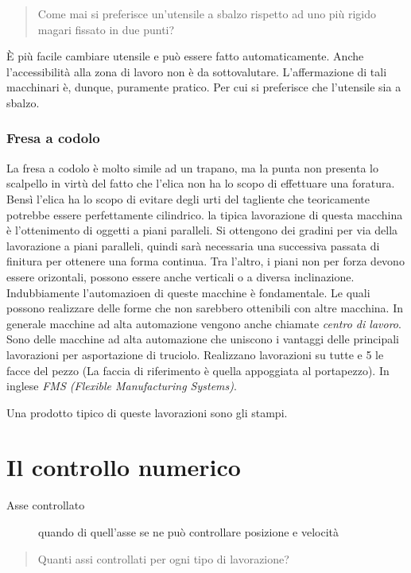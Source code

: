 \begin{quote}
Come mai si preferisce un'utensile a sbalzo rispetto ad uno più rigido magari fissato in due punti?
\end{quote}

È più facile cambiare utensile e può essere fatto automaticamente. Anche l'accessibilità alla zona di lavoro
non è da sottovalutare.
L'affermazione di tali macchinari è, dunque, puramente pratico.
Per cui si preferisce che l'utensile sia a sbalzo.

\subsubsection{Fresa a codolo}
La fresa a codolo è molto simile ad un trapano, ma la punta non presenta lo scalpello in virtù del fatto che
l'elica non ha lo scopo di effettuare una foratura. Bensì l'elica ha lo scopo di evitare degli urti
del tagliente che teoricamente potrebbe essere perfettamente cilindrico.
la tipica lavorazione di questa macchina è l'ottenimento di oggetti a piani paralleli.
Si ottengono dei gradini per via della lavorazione a piani paralleli, quindi sarà necessaria una successiva 
passata di finitura per ottenere una forma continua.
Tra l'altro, i piani non per forza devono essere orizontali, possono essere anche verticali o a diversa 
inclinazione.
Indubbiamente l'automazioen di queste macchine è fondamentale. Le quali possono realizzare delle forme che
non sarebbero ottenibili con altre macchina.
In generale macchine ad alta automazione vengono anche chiamate \emph{centro di lavoro}.
Sono delle macchine ad alta automazione che uniscono i vantaggi delle principali lavorazioni per asportazione
di truciolo.
Realizzano lavorazioni su tutte e 5 le facce del pezzo (La faccia di riferimento è quella appoggiata al 
portapezzo). In inglese \emph{FMS (Flexible Manufacturing Systems)}.

Una prodotto tipico di queste lavorazioni sono gli stampi.

\section*{Il controllo numerico}
\begin{description}
\item[Asse controllato] quando di quell'asse se ne può controllare posizione e velocità
\end{description}

\begin{quote}
Quanti assi controllati per ogni tipo di lavorazione?
\end{quote}


